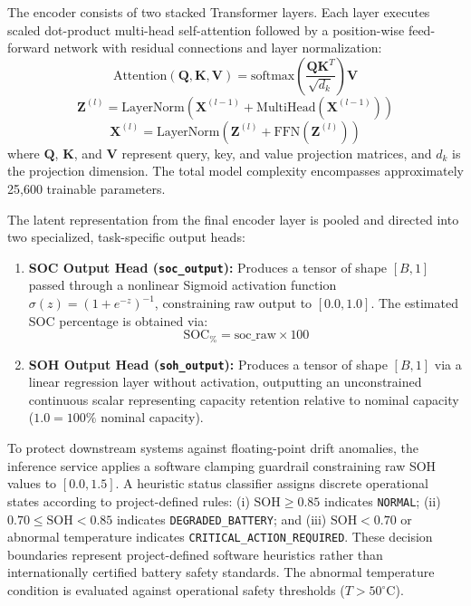 \documentclass[conference]{IEEEtran}
\begin{document}
The encoder consists of two stacked Transformer layers. Each layer executes scaled dot-product multi-head self-attention followed by a position-wise feed-forward network with residual connections and layer normalization:
\begin{equation}
\text{Attention}(\mathbf{Q}, \mathbf{K}, \mathbf{V}) = \text{softmax}\left(\frac{\mathbf{Q}\mathbf{K}^T}{\sqrt{d_k}}\right)\mathbf{V}
\end{equation}
\begin{equation}
\mathbf{Z}^{(l)} = \text{LayerNorm}\left(\mathbf{X}^{(l-1)} + \text{MultiHead}(\mathbf{X}^{(l-1)})\right)
\end{equation}
\begin{equation}
\mathbf{X}^{(l)} = \text{LayerNorm}\left(\mathbf{Z}^{(l)} + \text{FFN}(\mathbf{Z}^{(l)})\right)
\end{equation}
where $\mathbf{Q}$, $\mathbf{K}$, and $\mathbf{V}$ represent query, key, and value projection matrices, and $d_k$ is the projection dimension. The total model complexity encompasses approximately 25,600 trainable parameters.

The latent representation from the final encoder layer is pooled and directed into two specialized, task-specific output heads:
\begin{enumerate}
    \item \textbf{SOC Output Head (\texttt{soc\_output}):} Produces a tensor of shape $[B, 1]$ passed through a nonlinear Sigmoid activation function $\sigma(z) = (1 + e^{-z})^{-1}$, constraining raw output to $[0.0, 1.0]$. The estimated SOC percentage is obtained via:
    \begin{equation}
    \text{SOC}_{\%} = \text{soc\_raw} \times 100
    \end{equation}
    \item \textbf{SOH Output Head (\texttt{soh\_output}):} Produces a tensor of shape $[B, 1]$ via a linear regression layer without activation, outputting an unconstrained continuous scalar representing capacity retention relative to nominal capacity ($1.0 = 100\%$ nominal capacity).
\end{enumerate}

To protect downstream systems against floating-point drift anomalies, the inference service applies a software clamping guardrail constraining raw SOH values to $[0.0, 1.5]$. A heuristic status classifier assigns discrete operational states according to project-defined rules: (i) $\text{SOH} \ge 0.85$ indicates \texttt{NORMAL}; (ii) $0.70 \le \text{SOH} < 0.85$ indicates \texttt{DEGRADED\_BATTERY}; and (iii) $\text{SOH} < 0.70$ or abnormal temperature indicates \texttt{CRITICAL\_ACTION\_REQUIRED}. These decision boundaries represent project-defined software heuristics rather than internationally certified battery safety standards. The abnormal temperature condition is evaluated against operational safety thresholds ($T > 50^\circ\text{C}$).
\end{document}
